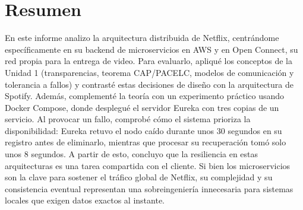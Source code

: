 \section*{Resumen}
En este informe analizo la arquitectura distribuida de Netflix, centrándome específicamente en su backend de microservicios en AWS y en Open Connect, su red propia para la entrega de video. Para evaluarlo, apliqué los conceptos de la Unidad 1 (transparencias, teorema CAP/PACELC, modelos de comunicación y tolerancia a fallos) y contrasté estas decisiones de diseño con la arquitectura de Spotify. Además, complementé la teoría con un experimento práctico usando Docker Compose, donde desplegué el servidor Eureka con tres copias de un servicio. Al provocar un fallo, comprobé cómo el sistema prioriza la disponibilidad: Eureka retuvo el nodo caído durante unos 30 segundos en su registro antes de eliminarlo, mientras que procesar su recuperación tomó solo unos 8 segundos. A partir de esto, concluyo que la resiliencia en estas arquitecturas es una tarea compartida con el cliente. Si bien los microservicios son la clave para sostener el tráfico global de Netflix, su complejidad y su consistencia eventual representan una sobreingeniería innecesaria para sistemas locales que exigen datos exactos al instante.

\newpage
